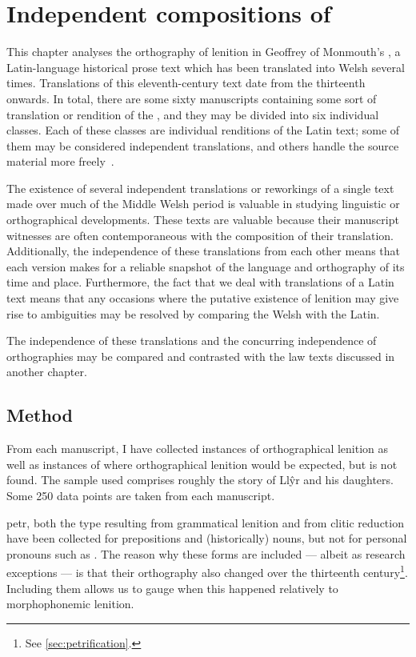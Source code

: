 \chapter{Independent compositions of }
This chapter analyses the orthography of lenition in Geoffrey of Monmouth's , a Latin-language historical prose text which has been translated into Welsh several times.
Translations of this eleventh-century text date from the thirteenth onwards.
In total, there are some sixty manuscripts containing some sort of translation or rendition of the , and they may be divided into six individual classes.
Each of these classes are individual renditions of the Latin text; some of them may be considered independent translations, and others handle the source material more freely~\autocite[xxiv-xxxi]{roberts_brut_1971}.

The existence of several independent translations or reworkings of a single text made over much of the Middle Welsh period is valuable in studying linguistic or orthographical developments.
These texts are valuable because their manuscript witnesses are often contemporaneous with the composition of their translation. Additionally, the independence of these translations from each other means that each version makes for a reliable snapshot of the language and orthography of its time and place.
Furthermore, the fact that we deal with translations of a Latin text means that any occasions where the putative existence of lenition may give rise to ambiguities may be resolved by comparing the Welsh with the Latin. 

The independence of these translations and the concurring independence of orthographies may be compared and contrasted with the law texts discussed in another chapter.



\section{Method}
\label{sec:method}
From each manuscript, I have collected instances of orthographical
lenition as well as instances of where orthographical lenition would
be expected, but is not found. The sample used comprises roughly the
story of Ll\^yr and his daughters.  Some 250 data points are taken
from each manuscript.

\Gls{petr}, both the type resulting from grammatical lenition and from clitic reduction have been collected for prepositions
and (historically) nouns, but not for personal pronouns such
as . The reason why these forms are included --- albeit
as research exceptions --- is that their orthography also changed over the
thirteenth century\footnote{See \ref{sec:petrification}.}. Including them allows
us to gauge when this happened relatively to morphophonemic lenition.


